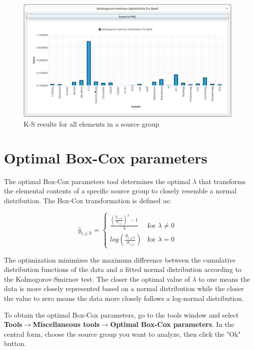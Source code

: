 \documentclass[12pt]{report}
\begin{document}
\begin{figure}[ht]
    \centering
    \includegraphics[width=14cm]{Figures/K-S-group-Normal.png} 
    \caption{K-S results for all elements in a source group}
    \label{fig:K-S-results-group}
\end{figure}
\FloatBarrier


\section{Optimal Box-Cox parameters}
The optimal Box-Cox parameters tool determines the optimal $\lambda$ that transforms the elemental contents of a specific source group to closely resemble a normal distribution. The Box-Cox transformation is defined as:

\begin{equation}
     \hat{y}_{i,j,k} = \begin{cases}
   \frac{\left(\frac{y_{i,j,k}}{\sigma_{i,j}}\right)^\lambda-1}{\lambda} & \text{for }\lambda \neq 0\\    
   log\left(\frac{y_{i,j,k}}{\sigma_{i,j}}\right) & \text{for } \lambda=0    
\end{cases}
\end{equation}

The optimization minimizes the maximum difference between the cumulative distribution functions of the data and a fitted normal distribution according to the Kolmogorov-Smirnov test. The closer the optimal value of $\lambda$ to one means the data is more closely represented based on a normal distribution while the closer the value to zero means the data more closely follows a log-normal distribution. 

To obtain the optimal Box-Cox parameters, go to the tools window and select \textbf{Tools}$\rightarrow$\textbf{Miscellaneous tools}$\rightarrow$\textbf{Optimal Box-Cox parameters}. In the central form, choose the source group you want to analyze, then click the "Ok" button.
\end{document}
